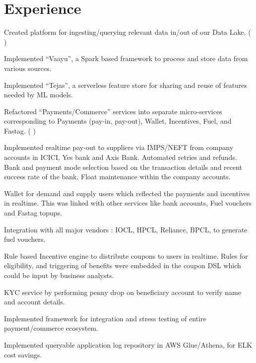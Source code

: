 \documentclass[]{deedy-resume-openfont}
\begin{document}
    
%
%
%
%
\section{Experience}
\hfill {}
\begin{tightemize}
	\item Created platform for ingesting/querying relevant data in/out of our Data Lake.\newline
    (
        {}
    )
	\item Implemented “Vaayu”, a Spark based framework to process and store data from various sources.
	\item Implemented “Tejas”, a serverless feature store for sharing and reuse of features needed by ML models.
	\item Refactored “Payments/Commerce” services into separate micro-services corresponding to Payments (pay-in, pay-out), Wallet, Incentives, Fuel, and Fastag.\newline
    (
        {}
    )
	\item Implemented realtime pay-out to suppliers via IMPS/NEFT from company accounts in ICICI, Yes bank and Axis Bank. Automated retries and refunds. Bank and payment mode selection based on the transaction details and recent success rate of the bank. Float maintenance within the company accounts.
	\item Wallet for demand and supply users which reflected the payments and incentives in realtime. This was linked with other services like bank accounts, Fuel vouchers and Fastag topups.
	\item Integration with all major vendors : IOCL, HPCL, Reliance, BPCL, to generate fuel vouchers.
	\item Rule based Incentive engine to distribute coupons to users in realtime. Rules for eligibility, and triggering of benefits were embedded in the coupon DSL which could be input by business analysts.
	\item KYC service by performing penny drop on beneficiary account to verify name and account details.
	\item Implemented framework for integration and stress testing of entire payment/commerce ecosystem.
	\item Implemented queryable application log repository in AWS Glue/Athena, for ELK cost savings.
\end{tightemize}
\end{document}
